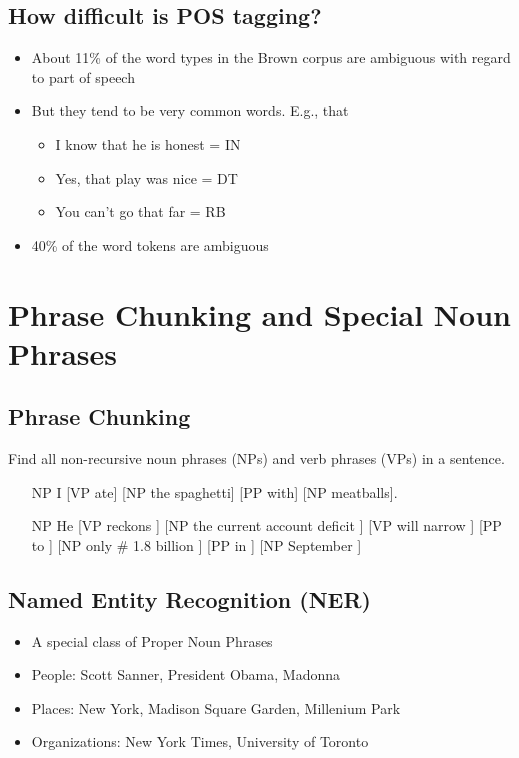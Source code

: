 \documentclass[11pt]{article}
\theoremstyle{definition}
\begin{document}
\subsection{How difficult is POS tagging?}
\begin{itemize}
  \item About 11\% of the word types in the Brown corpus are
  ambiguous with regard to part of speech
  \item But they tend to be very common words. E.g., that
  \begin{itemize}
    \item I know that he is honest = IN
    \item Yes, that play was nice = DT
    \item You can’t go that far = RB
  \end{itemize}
  \item 40\% of the word tokens are ambiguous
\end{itemize}

\section{Phrase Chunking and
Special Noun Phrases}

\subsection{Phrase Chunking}
Find all non-recursive noun phrases (NPs) and verb
phrases (VPs) in a sentence.

\begin{itemize}
  \item [NP I] [VP ate] [NP the spaghetti] [PP with] [NP meatballs].
  \item [NP He ] [VP reckons ] [NP the current account deficit ] [VP will
  narrow ] [PP to ] [NP only \# 1.8 billion ] [PP in ] [NP September ]
\end{itemize}

\subsection{Named Entity Recognition (NER)}
\begin{itemize}
  \item A special class of Proper Noun Phrases
  \item People: Scott Sanner, President Obama, Madonna
  \item Places: New York, Madison Square Garden, Millenium Park
  \item Organizations: New York Times, University of Toronto
\end{itemize}
\end{document}
